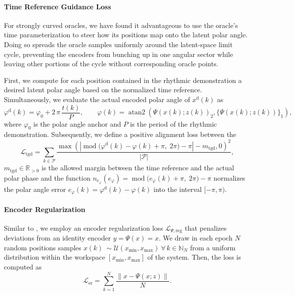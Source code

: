 \paragraph{Time Reference Guidance Loss}
For strongly curved oracles, we have found it advantageous to use the oracle’s time parameterization to steer how its positions map onto the latent polar angle. Doing so spreads the oracle samples uniformly around the latent-space limit cycle, preventing the encoders from bunching up in one angular sector while leaving other portions of the cycle without corresponding oracle points.

First, we compute for each position contained in the rhythmic demonstration a desired latent polar angle based on the normalized time reference. Simultaneously, we evaluate the actual encoded polar angle of $x^\mathrm{d}(k)$ as
\begin{equation}
     \varphi^\mathrm{d}(k) = \varphi_0 + 2 \, \pi \, \frac{t(k)}{P},
     \qquad
     \varphi(k) = \operatorname{atan2}\left ( \Psi(x(k);z(k))_2, \{ \Psi(x(k);z(k)) \}_1 \right),
\end{equation}
where $\varphi_0$ is the polar angle anchor and $P$ is the period of the rhythmic demonstration.
Subsequently, we define a positive alignment loss between the 
\begin{equation}
    \mathcal{L}_\mathrm{tgd} = \sum_{k \in \mathcal{P}} \frac{\max \left ( \left | \operatorname{mod} \bigl( \varphi^\mathrm{d}(k) - \varphi(k) + \pi,\; 2\pi\bigr) - \pi \right | - m_\mathrm{tgd}, 0 \right )^2}{|\mathcal{P}|},
\end{equation}
$m_\mathrm{tgd} \in \mathbb{R}_{>0}$ is the allowed margin between the time reference and the actual polar phase and the function $n_{e_\varphi}(e_\varphi) = \operatorname{mod} \bigl( e_\varphi(k) + \pi,\; 2\pi\bigr) - \pi$ normalizes the polar angle error $e_\varphi(k) = \varphi^\mathrm{d}(k) - \varphi(k) $ into the interval $[-\pi, \pi)$.

\paragraph{Encoder Regularization}
Similar to \citet{zhi2024teaching}, we employ an encoder regularization loss $\mathcal{L}_{\Psi, \mathrm{reg}}$ that penalizes deviations from an identity encoder $y = \Psi(x) = x$.
We draw in each epoch $N$ random positions samples $x(k) ~\sim \mathcal{U}(x_\mathrm{min}, x_\mathrm{max}) \: \forall \, k \in \mathbb{N}_N$ from a uniform distribution within the workspace $[x_\mathrm{min}, x_\mathrm{max}]$ of the system. Then, the loss is computed as
\begin{equation}
    \mathcal{L}_{\mathrm{er}} = \sum_{k=1}^{N} \frac{\lVert x - \Psi(x;z) \rVert}{N}.
\end{equation}


